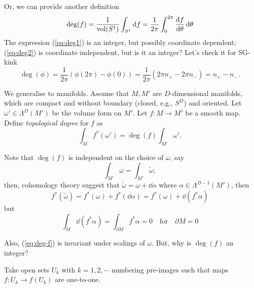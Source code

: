 \documentclass[a4paper,11pt]{article}
\begin{document}
    Or, we can provide another definition 
    \begin{equation}
        \deg(f) = \frac{1}{\text{vol}(S^1)} \int_{S^1} \dd{f} = \frac{1}{2 \pi} \int_{0}^{2 \pi} \dv{f}{\theta} \dd{\theta} \label{eq:deg2}
    \end{equation}
    The expression (\ref{eq:deg1}) is an integer, but possibly coordinate dependent; (\ref{eq:deg2}) is coordinate independent, but is it an integer? Let's check it for SG-kink 
    \begin{equation}
        \deg(\phi) = \frac{1}{2 \pi}(\phi(2 \pi) - \phi(0)) = \frac{1}{2 \pi} (2 \pi n_+ - 2 \pi n_-) = n_+ - n_-.
    \end{equation}

    We generalise to manifolds. Assume that $M, M'$ are $D$-dimensional manifolds, which are compact and without boundary (closed, e.g., $S^D$) and oriented. Let $\omega' \in \Lambda^D(M')$ be the volume form on $M'$. Let $f: M \to M'$ be a smooth map. Define \emph{topological degree} for $f$ as
    \begin{equation}
        \int_M f^*(\omega') = \deg(f) \int_{M'} \omega'. \label{eq:deg-f}
    \end{equation} 


    Note that $\deg(f)$ is independent on the choice of $\omega$, say 
    \begin{equation}
        \int_{M'} \omega = \int_{M'} \tilde \omega,
    \end{equation}
    then, cohomology theory suggest that $\tilde \omega = \omega + \dd{\alpha}$ where $\alpha \in \Lambda^{D-1}(M')$, then 
    \begin{equation}
        f^*(\tilde{\omega}) = f^*(\omega) + f^*(\dd{\alpha}) = f^*(\omega) + \dd{(f^* \alpha)}
    \end{equation} 
    but 
    \begin{equation}
        \int_M \dd{(f^* \alpha)} = \int_{\partial M} f^* \alpha = 0 \quad \text{for} \quad \partial M = 0
    \end{equation}

    Also, (\ref{eq:deg-f}) is invariant under scalings of $\omega$. But, why is $\deg(f)$ an integer?

    Take open sets $U_k$ with $k=1,2,\cdots$ numbering pre-images such that maps $f: U_k \to f(U_k)$ are one-to-one.
\end{document}
